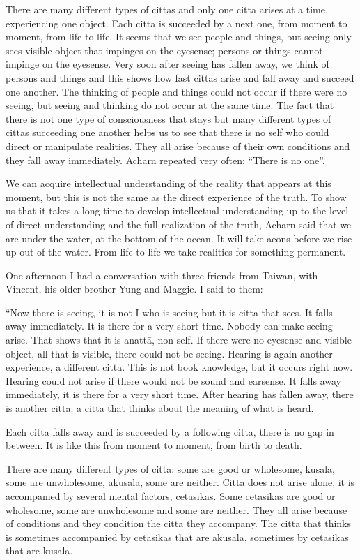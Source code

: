There are many different types of cittas and only one citta arises at a time, experiencing one object. Each citta is succeeded by a next one, from moment to moment, from life to life. It seems that we see people and things, but seeing only sees visible object that impinges on the eyesense; persons or things cannot 
impinge on the eyesense. Very soon after seeing has fallen away, we think of 
persons and things and this shows how fast cittas arise and fall away and succeed one another. The thinking of people and things could not occur if there 
were no seeing, but seeing and thinking do not occur at the same time. The fact 
that there is not one type of consciousness that stays but many different types of 
cittas succeeding one another helps us to see that there is no self who could direct or manipulate realities. They all arise because of their own conditions and 
they fall away immediately. Acharn repeated very often: “There is no one”. 

We can acquire intellectual understanding of the reality that appears at this moment, but this is not the same as the direct experience of the truth. To show us 
that it takes a long time to develop intellectual understanding up to the level of 
direct understanding and the full realization of the truth, Acharn said that we are 
under the water, at the bottom of the ocean. It will take aeons before we rise up 
out of the water. From life to life we take realities for something permanent. 

One afternoon I had a conversation with three friends from Taiwan, with Vincent, his older brother Yung and Maggie. I said to them: 

“Now there is seeing, it is not I who is seeing but it is citta that sees. It falls 
away immediately. It is there for a very short time. Nobody can make seeing 
arise. That shows that it is anattā, non-self. If there were no eyesense and visible 
object, all that is visible, there could not be seeing. Hearing is again another experience, a different citta. This is not book knowledge, but it occurs right now. 
Hearing could not arise if there would not be sound and earsense. It falls away 
immediately, it is there for a very short time. After hearing has fallen away, 
there is another citta: a citta that thinks about the meaning of what is heard. 

Each citta falls away and is succeeded by a following citta, there is no gap in 
between. It is like this from moment to moment, from birth to death. 

There are many different types of citta: some are good or wholesome, kusala, 
some are unwholesome, akusala, some are neither. Citta does not arise alone, it 
is accompanied by several mental factors, cetasikas. Some cetasikas are good or 
wholesome, some are unwholesome and some are neither. They all arise because of conditions and they condition the citta they accompany. The citta that 
thinks is sometimes accompanied by cetasikas that are akusala, sometimes by 
cetasikas that are kusala. 

